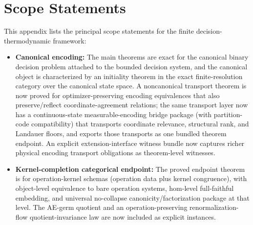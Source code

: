 \section{Scope Statements}\label{appendix-assumptions}

This appendix lists the principal scope statements for the finite decision-thermodynamic framework:

\begin{itemize}
	\item \textbf{Canonical encoding:} The main theorems are exact for the canonical binary decision problem attached to the bounded decision system, and the canonical object is characterized by an initiality theorem in the exact finite-resolution category over the canonical state space. A noncanonical transport theorem is now proved for optimizer-preserving encoding equivalences that also preserve/reflect coordinate-agreement relations; the same transport layer now has a continuous-state measurable-encoding bridge package (with partition-code compatibility) that transports coordinate relevance, structural rank, and Landauer floors, and exports those transports as one bundled theorem endpoint. An explicit extension-interface witness bundle now captures richer physical encoding transport obligations as theorem-level witnesses.
	\item \textbf{Kernel-completion categorical endpoint:} The proved endpoint theorem is for operation-kernel schemas (operation data plus kernel congruence), with object-level equivalence to bare operation systems, hom-level full-faithful embedding, and universal no-collapse canonicity/factorization package at that level. The AE-germ quotient and an operation-preserving renormalization-flow quotient-invariance law are now included as explicit instances.

\end{itemize}
